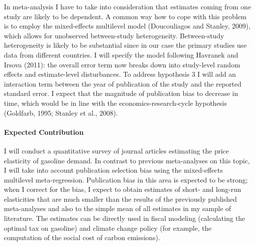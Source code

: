 In meta-analysis I have to take into consideration that estimates coming from one study are likely to be dependent. A common way how to cope with this problem is to employ the mixed-effects multilevel model (Doucouliagos and Stanley, 2009), which allows for unobserved between-study heterogeneity. Between-study heterogeneity is likely to be substantial since in our case the primary studies use data from different countries. I will specify the model following Havranek and Irsova (2011): the overall error term now breaks down into study-level random effects and estimate-level disturbances. To address hypothesis 3 I will add an interaction term between the year of publication of the study and the reported standard error. I expect that the magnitude of publication bias to decrease in time, which would be in line with the economics-research-cycle hypothesis (Goldfarb, 1995; Stanley et al., 2008).

\paragraph{Expected Contribution}

I will conduct a quantitative survey of journal articles estimating the price elasticity of gasoline demand. In contrast to previous meta-analyses on this topic, I will take into account publication selection bias using the mixed-effects multilevel meta-regression. Publication bias in this area is expected to be strong; when I correct for the bias, I expect to obtain estimates of short- and long-run elasticities that are much smaller than the results of the previously published meta-analyses and also to the simple mean of all estimates in my sample of literature. The estimates can be directly used in fiscal modeling (calculating the optimal tax on gasoline) and climate change policy (for example, the computation of the social cost of carbon emissions).

